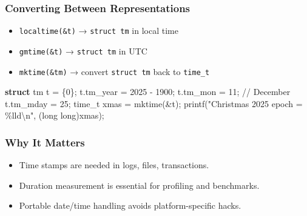 \documentclass[
  letterpaper,
  DIV=11,
  numbers=noendperiod]{scrreprt}
\newenvironment{Shaded}{\begin{snugshade}}{\end{snugshade}}
\newcommand{\CommentTok}[1]{\textcolor[rgb]{0.37,0.37,0.37}{#1}}
\newcommand{\DataTypeTok}[1]{\textcolor[rgb]{0.68,0.00,0.00}{#1}}
\newcommand{\DecValTok}[1]{\textcolor[rgb]{0.68,0.00,0.00}{#1}}
\newcommand{\KeywordTok}[1]{\textcolor[rgb]{0.00,0.23,0.31}{\textbf{#1}}}
\newcommand{\NormalTok}[1]{\textcolor[rgb]{0.00,0.23,0.31}{#1}}
\newcommand{\OperatorTok}[1]{\textcolor[rgb]{0.37,0.37,0.37}{#1}}
\newcommand{\SpecialCharTok}[1]{\textcolor[rgb]{0.37,0.37,0.37}{#1}}
\newcommand{\StringTok}[1]{\textcolor[rgb]{0.13,0.47,0.30}{#1}}
\providecommand{\tightlist}{%
  \setlength{\itemsep}{0pt}\setlength{\parskip}{0pt}}
\begin{document}
\subsubsection{Converting Between
Representations}\label{converting-between-representations}

\begin{itemize}
\tightlist
\item
  \texttt{localtime(\&t)} → \texttt{struct\ tm} in local time
\item
  \texttt{gmtime(\&t)} → \texttt{struct\ tm} in UTC
\item
  \texttt{mktime(\&tm)} → convert \texttt{struct\ tm} back to
  \texttt{time\_t}
\end{itemize}

\begin{Shaded}
\begin{Highlighting}[]
\KeywordTok{struct}\NormalTok{ tm t }\OperatorTok{=} \OperatorTok{\{}\DecValTok{0}\OperatorTok{\};}
\NormalTok{t}\OperatorTok{.}\NormalTok{tm\_year }\OperatorTok{=} \DecValTok{2025} \OperatorTok{{-}} \DecValTok{1900}\OperatorTok{;}
\NormalTok{t}\OperatorTok{.}\NormalTok{tm\_mon }\OperatorTok{=} \DecValTok{11}\OperatorTok{;} \CommentTok{// December}
\NormalTok{t}\OperatorTok{.}\NormalTok{tm\_mday }\OperatorTok{=} \DecValTok{25}\OperatorTok{;}
\DataTypeTok{time\_t}\NormalTok{ xmas }\OperatorTok{=}\NormalTok{ mktime}\OperatorTok{(\&}\NormalTok{t}\OperatorTok{);}
\NormalTok{printf}\OperatorTok{(}\StringTok{"Christmas 2025 epoch = }\SpecialCharTok{\%lld\textbackslash{}n}\StringTok{"}\OperatorTok{,} \OperatorTok{(}\DataTypeTok{long} \DataTypeTok{long}\OperatorTok{)}\NormalTok{xmas}\OperatorTok{);}
\end{Highlighting}
\end{Shaded}

\subsubsection{Why It Matters}\label{why-it-matters-52}

\begin{itemize}
\tightlist
\item
  Time stamps are needed in logs, files, transactions.
\item
  Duration measurement is essential for profiling and benchmarks.
\item
  Portable date/time handling avoids platform-specific hacks.
\end{itemize}
\end{document}
